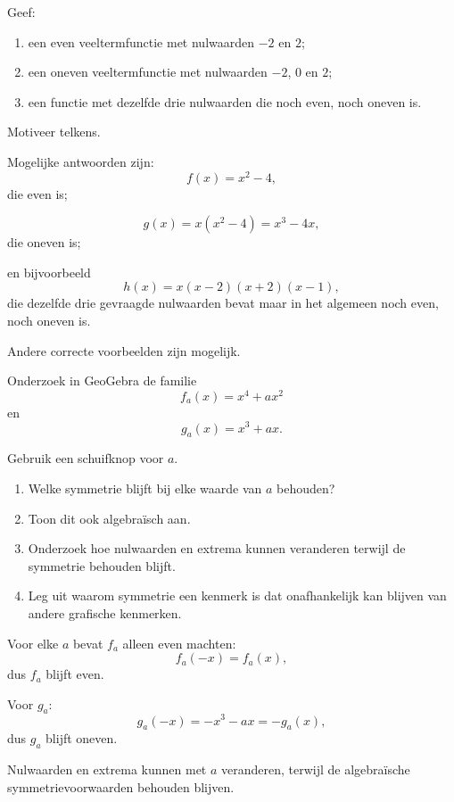 \documentclass{ximera}
\begin{document}
\begin{oefening}{\oefG}

Geef:
\begin{enumerate}
  \item een even veeltermfunctie met nulwaarden \(-2\) en \(2\);
  \item een oneven veeltermfunctie met nulwaarden \(-2\), \(0\) en \(2\);
  \item een functie met dezelfde drie nulwaarden die noch even, noch oneven is.
\end{enumerate}

Motiveer telkens.

\begin{oplossing}
Mogelijke antwoorden zijn:
\[
f(x)=x^2-4,
\]
die even is;

\[
g(x)=x(x^2-4)=x^3-4x,
\]
die oneven is;

en bijvoorbeeld
\[
h(x)=x(x-2)(x+2)(x-1),
\]
die dezelfde drie gevraagde nulwaarden bevat maar in het algemeen noch even,
noch oneven is.

Andere correcte voorbeelden zijn mogelijk.
\end{oplossing}

\end{oefening}

\begin{oefening}{\oefG}

Onderzoek in GeoGebra de familie
\[
f_a(x)=x^4+a x^2
\]
en
\[
g_a(x)=x^3+a x.
\]

Gebruik een schuifknop voor \(a\).

\begin{enumerate}
  \item Welke symmetrie blijft bij elke waarde van \(a\) behouden?
  \item Toon dit ook algebraïsch aan.
  \item Onderzoek hoe nulwaarden en extrema kunnen veranderen terwijl de symmetrie behouden blijft.
  \item Leg uit waarom symmetrie een kenmerk is dat onafhankelijk kan blijven van andere
        grafische kenmerken.
\end{enumerate}

\begin{oplossing}
Voor elke \(a\) bevat \(f_a\) alleen even machten:
\[
f_a(-x)=f_a(x),
\]
dus \(f_a\) blijft even.

Voor \(g_a\):
\[
g_a(-x)=-x^3-a x=-g_a(x),
\]
dus \(g_a\) blijft oneven.

Nulwaarden en extrema kunnen met \(a\) veranderen, terwijl de algebraïsche
symmetrievoorwaarden behouden blijven.
\end{oplossing}

\end{oefening}
\end{document}
